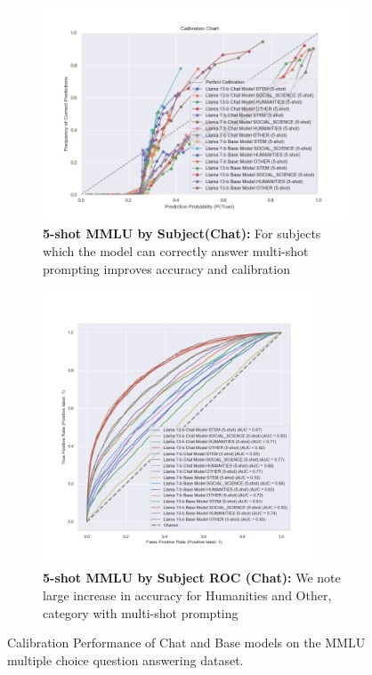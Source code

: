 \documentclass[11pt]{article}
\begin{document}
\begin{figure}
     \hfill
     \begin{subfigure}[b]{0.60\textwidth}
         \centering
         \includegraphics[width=1.1\textwidth]{figures/5-shot-MMLU-subjects.png}
         \caption{\textbf{5-shot MMLU by Subject(Chat):}  For subjects which the model can correctly 
         answer multi-shot prompting improves accuracy and calibration}
         \label{fig:5-shot-logicqa}
     \end{subfigure}     
    \hfill 
     \begin{subfigure}[b]{0.38\textwidth}
         \centering \includegraphics[width=0.9\textwidth]{figures/5-shot-MMLU-subjects-roc.png}
         \caption{\textbf{5-shot MMLU by Subject ROC (Chat):} We note large increase in accuracy for 
         Humanities and Other, category with multi-shot prompting}
         \label{fig:0-shot-MMLU}
    \end{subfigure} 
    
        \caption{Calibration Performance of Chat and Base models on the MMLU multiple choice question answering dataset.}
        \label{fig:three graphs}
\end{figure}
\end{document}
